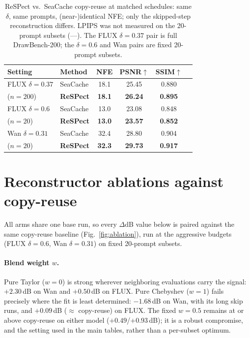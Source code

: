 \begin{table}[h]
  \centering
  \caption{ReSPect vs.\ SeaCache copy-reuse at matched schedules: same
  $\delta$, same prompts, (near-)identical NFE; only the skipped-step
  reconstruction differs. LPIPS was not measured on the 20-prompt
  subsets (---). The FLUX $\delta{=}0.37$ pair is full DrawBench-200;
  the $\delta{=}0.6$ and Wan pairs are fixed 20-prompt subsets.}
  \label{tab:abl-sea}
  \vspace{0.1cm}
  {\scriptsize\setlength{\tabcolsep}{4pt}
  \begin{tabular}{llcccc}
    \toprule
    Setting & Method & NFE & PSNR$\uparrow$ & SSIM$\uparrow$  \\
    \midrule
    FLUX $\delta{=}0.37$ & SeaCache & 18.1 & 25.45 & 0.880  \\
    ($n{=}200$) & \textbf{ReSPect} & \textbf{18.1} & \textbf{26.24} & \textbf{0.895}  \\
    \midrule
    FLUX $\delta{=}0.6$ & SeaCache & 13.0 & 23.08 & 0.848  \\
    ($n{=}20$) & \textbf{ReSPect} & \textbf{13.0} & \textbf{23.57} & \textbf{0.852} \\
    \midrule
    Wan $\delta{=}0.31$ & SeaCache & 32.4 & 28.80 & 0.904  \\
    ($n{=}20$) & \textbf{ReSPect} & \textbf{32.3} & \textbf{29.73} & \textbf{0.917} &  \\
    \bottomrule
  \end{tabular}}
\end{table}

\section{Reconstructor ablations against copy-reuse}
\label{app:abl-reuse}

All arms share one base run, so every $\Delta$dB value below is paired
against the same copy-reuse baseline (Fig.~\ref{fig:ablation}), run at
the aggressive budgets (FLUX $\delta{=}0.6$, Wan $\delta{=}0.31$) on
fixed 20-prompt subsets.

\paragraph{Blend weight $w$.}
Pure Taylor ($w{=}0$) is strong wherever neighboring evaluations carry
the signal: $+2.30$\,dB on Wan and $+0.50$\,dB on FLUX. Pure Chebyshev
($w{=}1$) fails precisely where the fit is least determined:
$-1.68$\,dB on Wan, with its long skip runs, and $+0.09$\,dB
($\approx$ copy-reuse) on FLUX. The fixed $w{=}0.5$ remains at or above
copy-reuse on either model ($+0.49$/$+0.93$\,dB); it is a robust
compromise, and the setting used in the main tables, rather than a
per-subset optimum.

